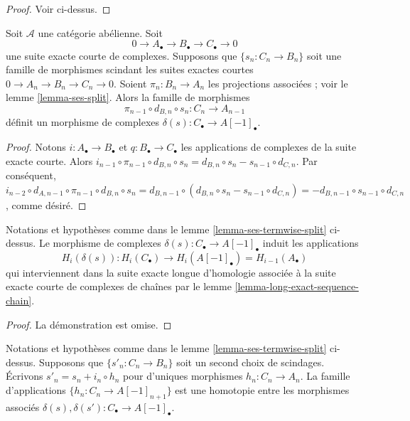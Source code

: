 \begin{proof}
Voir ci-dessus.
\end{proof}

\begin{lemma}
\label{lemma-ses-termwise-split}
Soit $\mathcal{A}$ une catégorie abélienne.
Soit
$$
0 \to A_\bullet \to B_\bullet \to C_\bullet \to 0
$$
une suite exacte courte de complexes.
Supposons que $\{s_n : C_n \to B_n\}$ soit une famille
de morphismes scindant les suites exactes courtes
$0 \to A_n \to B_n \to C_n \to 0$. Soient
$\pi_n : B_n \to A_n$ les
projections associées ; voir le lemme \ref{lemma-ses-split}.
Alors la famille de morphismes
$$
\pi_{n - 1} \circ d_{B, n} \circ s_n
:
C_n \to A_{n - 1}
$$
définit un morphisme de complexes $\delta(s) : C_\bullet \to A[-1]_\bullet$.
\end{lemma}

\begin{proof}
Notons $i : A_\bullet \to B_\bullet$ et $q : B_\bullet \to C_\bullet$
les applications de complexes de la suite exacte courte. Alors
$i_{n - 1} \circ \pi_{n - 1} \circ d_{B, n} \circ s_n =
d_{B, n} \circ s_n - s_{n - 1} \circ d_{C, n}$. Par conséquent,
$i_{n - 2} \circ d_{A, n - 1} \circ \pi_{n - 1} \circ d_{B, n} \circ s_n =
d_{B, n - 1} \circ (d_{B, n} \circ s_n - s_{n - 1} \circ d_{C, n}) =
- d_{B, n - 1} \circ s_{n - 1} \circ d_{C, n}$, comme désiré.
\end{proof}

\begin{lemma}
\label{lemma-ses-termwise-split-long}
Notations et hypothèses comme dans le lemme \ref{lemma-ses-termwise-split} ci-dessus.
Le morphisme de complexes $\delta(s) : C_\bullet \to A[-1]_\bullet$
induit les applications
$$
H_i(\delta(s)) :
H_i(C_\bullet) \longrightarrow H_i(A[-1]_\bullet) = H_{i - 1}(A_\bullet)
$$
qui interviennent dans la suite exacte longue d'homologie associée
à la suite exacte courte de complexes de chaînes par le
lemme \ref{lemma-long-exact-sequence-chain}.
\end{lemma}

\begin{proof}
La démonstration est omise.
\end{proof}

\begin{lemma}
\label{lemma-ses-termwise-split-homotopy}
Notations et hypothèses comme dans le lemme \ref{lemma-ses-termwise-split} ci-dessus.
Supposons que $\{s'_n : C_n \to B_n\}$ soit un second choix de scindages.
Écrivons $s'_n = s_n + i_n \circ h_n$ pour d'uniques
morphismes $h_n : C_n \to A_n$. La famille d'applications
$\{h_n : C_n \to A[-1]_{n + 1}\}$ est une homotopie entre
les morphismes associés
$\delta(s), \delta(s') : C_\bullet \to A[-1]_\bullet$.
\end{lemma}

